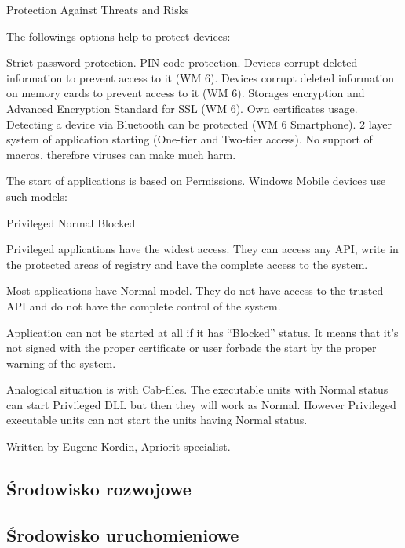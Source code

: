 Protection Against Threats and Risks

The followings options help to protect devices:

Strict password protection. PIN code protection. Devices corrupt deleted
information to prevent access to it (WM 6). Devices corrupt deleted information
on memory cards to prevent access to it (WM 6). Storages encryption and Advanced
Encryption Standard for SSL (WM 6). Own certificates usage. Detecting a device
via Bluetooth can be protected (WM 6 Smartphone). 2 layer system of application
starting (One-tier and Two-tier access). No support of macros, therefore viruses
can make much harm.

The start of applications is based on Permissions. Windows Mobile devices use
such models:

Privileged Normal Blocked

Privileged applications have the widest access. They can access any API, write in
the protected areas of registry and have the complete access to the system.

Most applications have Normal model. They do not have access to the trusted API
and do not have the complete control of the system.

Application can not be started at all if it has “Blocked” status. It means that
it’s not signed with the proper certificate or user forbade the start by the
proper warning of the system.

Analogical situation is with Cab-files. The executable units with Normal status
can start Privileged DLL but then they will work as Normal. However Privileged
executable units can not start the units having Normal status.

Written by Eugene Kordin, Apriorit specialist.

\subsection{Środowisko rozwojowe}
\subsection{Środowisko uruchomieniowe}
